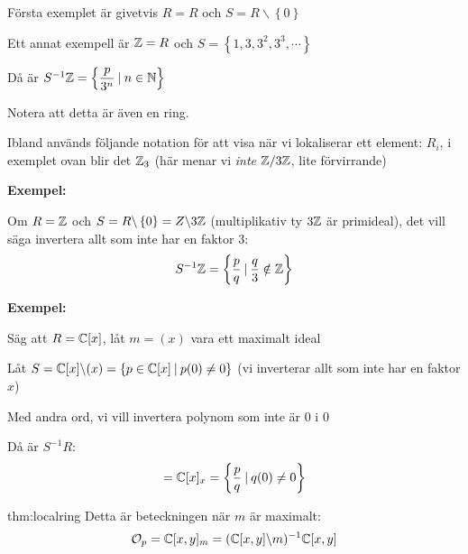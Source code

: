 \noindent Första exemplet är givetvis $R = R$ och $S = R\backslash\left\{0\right\}$
\par\bigskip
\noindent Ett annat exempell är $\mathbb{Z} = R$ och $S = \left\{1,3,3^2,3^3,\cdots\right\}$\par
\noindent Då är $S^{-1}\mathbb{Z} = \left\{\dfrac{p}{3^n}\:|\: n\in\mathbb{N}\right\}$\par
\noindent Notera att detta är även en ring. 
\par\bigskip
\noindent Ibland används följande notation för att visa när vi lokaliserar ett element: $R_i$, i exemplet ovan blir det $\mathbb{Z}_3$ (här menar vi \textit{inte} $\mathbb{Z}/3\mathbb{Z}$, lite förvirrande) 
\par\bigskip
\noindent\textbf{Exempel:}\par
\noindent Om $R=\mathbb{Z}$ och $S = R\backslash\left\{0\right\} = Z\backslash3\mathbb{Z}$ (multiplikativ ty $3\mathbb{Z}$ är primideal), det vill säga invertera allt som inte har en faktor 3:
\begin{equation*}
  \begin{gathered}
    S^{-1}\mathbb{Z} = \left\{\dfrac{p}{q}\:|\: \dfrac{q}{3}\notin\mathbb{Z}\right\}
  \end{gathered}
\end{equation*}
\par\bigskip
\noindent\textbf{Exempel:}\par
\noindent Säg att $R = \mathbb{C}[x]$, låt $m=(x)$ vara ett maximalt ideal\par
\noindent Låt $S = \mathbb{C}[x]\backslash(x) = \left\{p\in\mathbb{C}[x]\:|\: p(0)\neq0\right\}$ (vi inverterar allt som inte har en faktor $x$)\par
\noindent Med andra ord, vi vill invertera polynom som inte är 0 i 0\par
\noindent Då är $S^{-1}R$:
\begin{equation*}
  \begin{gathered}
    = \mathbb{C}[x]_x = \left\{\dfrac{p}{q}\:|\:q(0)\neq0\right\}
  \end{gathered}
\end{equation*}
\par\bigskip
\begin{theo}{thm:localring}
  \noindent Detta är beteckningen när $m$ är maximalt:
  \begin{equation*}
    \begin{gathered}
      \mathcal{O}_p = \mathbb{C}[x,y]_m = (\mathbb{C}[x,y]\backslash m)^{-1}\mathbb{C}[x,y]
    \end{gathered}
  \end{equation*}
\end{theo}
